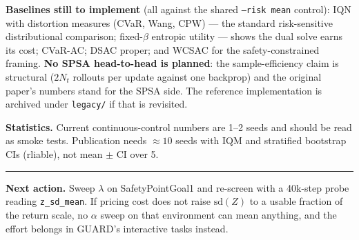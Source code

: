\documentclass[10pt,a4paper]{article}
\begin{document}
\textbf{Baselines still to implement} (all against the shared \texttt{--risk mean}
control): IQN with distortion measures (CVaR, Wang, CPW) --- the standard
risk-sensitive distributional comparison; fixed-$\beta$ entropic utility --- shows
the dual solve earns its cost; CVaR-AC; DSAC proper; and WCSAC for the
safety-constrained framing. \textbf{No SPSA head-to-head is planned}: the
sample-efficiency claim is structural ($2N_t$ rollouts per update against one
backprop) and the original paper's numbers stand for the SPSA side. The reference
implementation is archived under \texttt{legacy/} if that is revisited.

\textbf{Statistics.} Current continuous-control numbers are 1--2 seeds and should be
read as smoke tests. Publication needs $\approx 10$ seeds with IQM and stratified
bootstrap CIs (rliable), not mean $\pm$ CI over 5.

\vspace{0.4em}
\hrule
\vspace{0.4em}
\textcolor{soft}{\small\textbf{Next action.} Sweep $\lambda$ on
SafetyPointGoal1 and re-screen with a 40k-step probe reading
\texttt{z\_sd\_mean}. If pricing cost does not raise $\mathrm{sd}(Z)$ to a usable
fraction of the return scale, no $\alpha$ sweep on that environment can mean
anything, and the effort belongs in GUARD's interactive tasks instead.}
\end{document}
